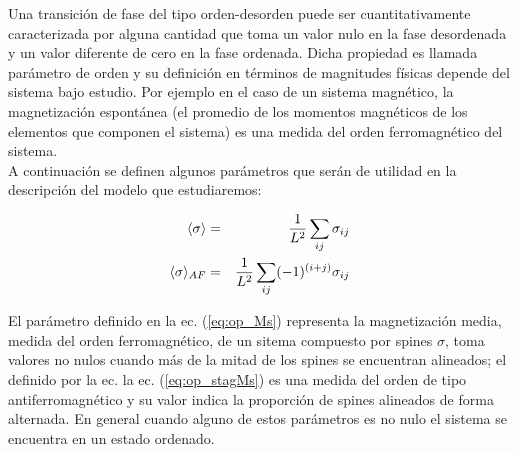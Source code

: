 
Una transición de fase  del tipo orden-desorden puede ser cuantitativamente caracterizada por alguna cantidad que toma un valor nulo en la fase desordenada y un valor
diferente de cero en la fase ordenada. Dicha propiedad es llamada parámetro de orden y su definición en términos de magnitudes físicas depende del sistema
bajo estudio. Por ejemplo en el caso de un sistema magnético, la magnetización espontánea (el promedio de los momentos magnéticos de los elementos que componen
 el sistema) es una medida del orden ferromagnético del sistema.\\
A continuación se definen algunos parámetros que serán de utilidad en la descripción del modelo que estudiaremos:

\begin{center} 
\begin{eqnarray}
	\label{eq:op_Ms}
	\langle \sigma \rangle&=&\frac{1}{L^{2}}\sum_{ij}\sigma_{ij} \\
	\label{eq:op_stagMs}
	\langle \sigma \rangle_{AF}&=&\frac{1}{L^{2}}\sum_{ij}(-1)^{(i+j)}\sigma_{ij} \\
\end{eqnarray}
\end{center}

El parámetro definido en la ec. (\ref{eq:op_Ms}) representa la magnetización media, medida del orden ferromagnético, de un sitema compuesto por spines $\sigma$,
 toma valores no nulos cuando más de la mitad de los spines se encuentran alineados;
 el definido por la ec. la ec. (\ref{eq:op_stagMs}) es una medida del orden de tipo antiferromagnético y su valor indica la proporción de
 spines alineados de forma alternada. En general cuando alguno de estos parámetros es no nulo el sistema se encuentra en un estado ordenado.\\


